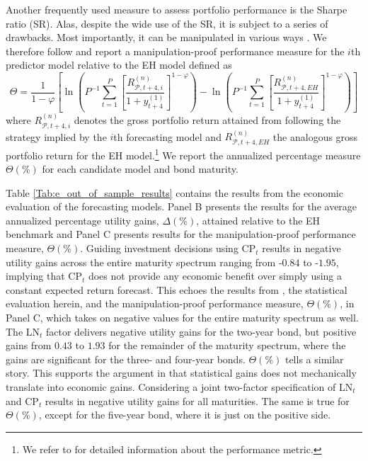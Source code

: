 \documentclass[12pt,letterpaper,leqno,doublespacing]{article}
\begin{document}
Another frequently used measure to assess portfolio performance is the Sharpe ratio (SR). Alas, despite the wide use of the SR, it is subject to a series of drawbacks. Most importantly, it can be manipulated in various ways \citep{GoetzmannIngersollSpiegelWelch}. We therefore follow \cite{ThorntonValente2012} and report a manipulation-proof performance measure for the $i$th predictor model relative to the EH model defined as
\begin{equation}
    \Theta = \frac{1}{1-\varphi} \left[\ln\left(P^{-1}\sum_{t=1}^{P}\left[\frac{R_{\mathcal{P},t+4,i}^{\left(n\right)}}{1+y_{t+4}^{\left(1\right)}}\right]^{1-\varphi}\right) - \ln\left(P^{-1}\sum_{t=1}^{P}\left[\frac{R_{\mathcal{P},t+4,EH}^{\left(n\right)}}{1+y_{t+4}^{\left(1\right)}}\right]^{1-\varphi}\right)\right]
    \label{eq:e_gisw}
\end{equation}
where $R_{\mathcal{P},t+4,i}^{\left(n\right)}$ denotes the gross portfolio return attained from following the strategy implied by the $i$th forecasting model and $R_{\mathcal{P},t+4,EH}^{\left(n\right)}$ the analogous gross portfolio return for the EH model.\footnote{We refer to \cite{GoetzmannIngersollSpiegelWelch} for detailed information about the performance metric.} We report the annualized percentage measure $\Theta\left(\%\right)$ for each candidate model and bond maturity.

Table \ref{Tab:e_out_of_sample_results} contains the results from the economic evaluation of the forecasting models. Panel B presents the results for the average annualized percentage utility gains, $\Delta\left(\%\right)$, attained relative to the EH benchmark and Panel C presents results for the manipulation-proof performance measure, $\Theta\left(\%\right)$. Guiding investment decisions using CP$_{t}$ results in negative utility gains across the entire maturity spectrum ranging from -$0.84$ to -$1.95$, implying that CP$_{t}$ does not provide any economic benefit over simply using a constant expected return forecast. This echoes the results from \cite{ThorntonValente2012}, the statistical evaluation herein, and the manipulation-proof performance measure, $\Theta\left(\%\right)$, in Panel C, which takes on negative values for the entire maturity spectrum as well. The LN$_{t}$ factor delivers negative utility gains for the two-year bond, but positive gains from $0.43$ to $1.93$ for the remainder of the maturity spectrum, where the gains are significant for the three- and four-year bonds. $\Theta\left(\%\right)$ tells a similar story. This supports the argument in \cite{ThorntonValente2012} that statistical gains does not mechanically translate into economic gains. Considering a joint two-factor specification of LN$_{t}$ and CP$_{t}$ results in negative utility gains for all maturities. The same is true for $\Theta\left(\%\right)$, except for the five-year bond, where it is just on the positive side. 
\end{document}
